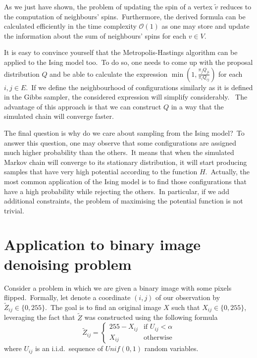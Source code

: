 \documentclass[shortabstract, english, lic]{iithesis}
\theoremstyle{default_theorem_style}\newtheorem{theorem}{Theorem}
\theoremstyle{default_theorem_style}\newtheorem{definition}{Definition}
\begin{document}
\noindent As we just have shown, the problem of updating the spin of a vertex $\tilde{v}$ reduces to the computation of
neighbours' spins.\ Furthermore, the derived formula can be calculated efficiently in the time
complexity $\mathcal{O}(1)$ as one may store and update the information about the sum of neighbours'
spins for each $v \in V$.\newline

\noindent It is easy to convince yourself that the Metropolis-Hastings algorithm can be applied to the Ising model
too.\ To do so, one needs to come up with the proposal distribution $Q$ and be able to calculate the expression
$\min{(1, \frac{\pi_j Q_{ji}}{\pi_i Q_{ij}})}$ for each $i, j \in E$.\ If we define the neighbourhood of configurations
similarly as it is defined in the Gibbs sampler, the considered expression will simplify considerably. \ The
advantage of this approach is that we can construct $Q$ in a way that the simulated chain will converge faster.\newline

\noindent The final question is why do we care about sampling from the Ising model?\ To answer this question, one may
observe that some configurations are assigned much higher probability than the others.\ It means that when the simulated
Markov chain will converge to its stationary distribution, it will start producing samples that have very high
potential according to the function $H$.\ Actually, the most common application of the Ising model is to find
those configurations that have a high probability while rejecting the others.\ In particular, if we add
additional constraints, the problem of maximising the potential function is not trivial.

\section{Application to binary image denoising problem} \label{sec:binary_images_problem}

Consider a problem in which we are given a binary image with some pixels flipped.\ Formally, let denote a coordinate
$(i, j)$ of our observation by $\tilde{Z}_{ij} \in \{0, 255\}$.\ The goal is to find an original image $X$ such that
$X_{ij} \in \{0, 255\}$, leveraging the fact that $\tilde{Z}$ was constructed using the following formula
$$
\tilde{Z}_{ij} =
\begin{cases}
  255 - X_{ij} &\text{if $U_{ij} < \alpha$}\\
  X_{ij} &\text{otherwise}
\end{cases}
$$
where $U_{ij}$ is an i.i.d.\ sequence of $Unif(0, 1)$ random variables.
\end{document}

